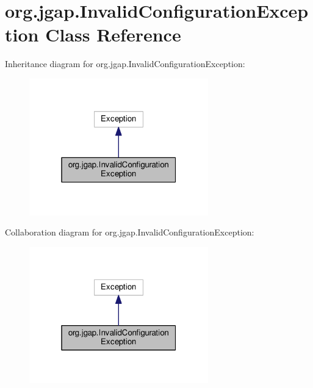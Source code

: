 \hypertarget{classorg_1_1jgap_1_1_invalid_configuration_exception}{\section{org.\-jgap.\-Invalid\-Configuration\-Exception Class Reference}
\label{classorg_1_1jgap_1_1_invalid_configuration_exception}
}


Inheritance diagram for org.\-jgap.\-Invalid\-Configuration\-Exception\-:
\nopagebreak
\begin{figure}[H]
\begin{center}
\leavevmode
\includegraphics[width=220pt]{classorg_1_1jgap_1_1_invalid_configuration_exception__inherit__graph}
\end{center}
\end{figure}


Collaboration diagram for org.\-jgap.\-Invalid\-Configuration\-Exception\-:
\nopagebreak
\begin{figure}[H]
\begin{center}
\leavevmode
\includegraphics[width=220pt]{classorg_1_1jgap_1_1_invalid_configuration_exception__coll__graph}
\end{center}
\end{figure}
